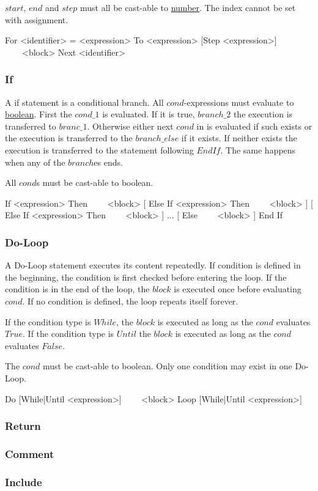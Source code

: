 $start$, $end$ and $step$ must all be cast-able to \hyperref[type:number]{number}.
The index cannot be set with assignment.

\begin{grammar}
For <identifier> = <expression> To <expression> [Step <expression>]
~~~~<block>
Next <identifier>
\end{grammar}

\subsubsection{If}
\label{stat:if}
A if statement is a conditional branch.
All $cond$-expressions must evaluate to \hyperref[type:boolean]{boolean}.
First the $cond\_1$ is evaluated.
If it is true,
$branch\_2$ the execution is transferred to $branc\_1$.
Otherwise either next $cond$ in is evaluated if such exists
or the execution is transferred to the $branch\_else$ if it exists.
If neither exists the execution is transferred to the statement following $End If$.
The same happens when any of the $branch$es ends.

All $cond$s must be cast-able to boolean.

\begin{grammar}
If <expression> Then
~~~~<block>
[
Else If <expression> Then
~~~~<block>
]
[
Else If <expression> Then
~~~~<block>
]
...
[
Else
~~~~<block>
]
End If
\end{grammar}

\subsubsection{Do-Loop}
\label{stat:do}
A Do-Loop statement executes its content repeatedly.
If condition is defined in the beginning,
the condition is first checked before entering the loop.
If the condition is in the end of the loop,
the $block$ is executed once before evaluating $cond$.
If no condition is defined,
the loop repeats itself forever.

If the condition type is $While$,
the $block$ is executed as long as the $cond$ evaluates $True$.
If the condition type is $Until$
the $block$ is executed as long as the $cond$ evaluates $False$.

The $cond$ must be cast-able to boolean.
Only one condition may exist in one Do-Loop.

\begin{grammar}
Do [While|Until <expression>]
~~~~<block>
Loop [While|Until <expression>]
\end{grammar}

\subsubsection{Return}
\label{stat:return}

\subsubsection{Comment}
\label{stat:comment}

\subsubsection{Include}
\label{stat:include}